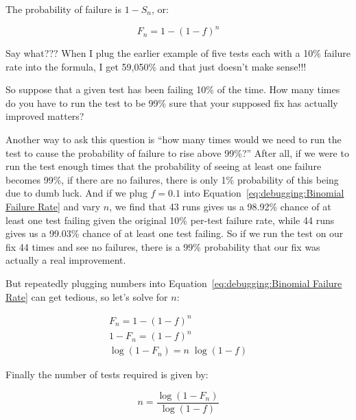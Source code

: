 The probability of failure is $1-S_n$, or:

\begin{equation}
	F_n = 1-\left(1-f\right)^n
\label{eq:debugging:Binomial Failure Rate}
\end{equation}

\QuickQuiz{}
	Say what???
	When I plug the earlier example of five tests each with a
	10\% failure rate into the formula, I get 59,050\% and that
	just doesn't make sense!!!
 \QuickQuizEnd

So suppose that a given test has been failing 10\% of the time.
How many times do you have to run the test to be 99\% sure that
your supposed fix has actually improved matters?

Another way to ask this question is ``how many times would we need
to run the test to cause the probability of failure to rise above 99\%?''
After all, if we were to run the test enough times that the probability
of seeing at least one failure becomes 99\%, if there are no failures,
there is only 1\% probability of this being due to dumb luck.
And if we plug $f=0.1$ into
Equation~\ref{eq:debugging:Binomial Failure Rate} and vary $n$,
we find that 43 runs gives us a 98.92\% chance of at least one test failing
given the original 10\% per-test failure rate,
while 44 runs gives us a 99.03\% chance of at least one test failing.
So if we run the test on our fix 44 times and see no failures, there
is a 99\% probability that our fix was actually a real improvement.

But repeatedly plugging numbers into
Equation~\ref{eq:debugging:Binomial Failure Rate}
can get tedious, so let's solve for $n$:

\begin{eqnarray}
	F_n = 1-\left(1-f\right)^n \\
	1 - F_n = \left(1-f\right)^n \\
	\log \left(1 - F_n\right) = n \; \log \left(1 - f\right)
\end{eqnarray}

Finally the number of tests required is given by:

\begin{equation}
	n = \frac{\log\left(1 - F_n\right)}{\log\left(1 - f\right)}
\label{eq:debugging:Binomial Number of Tests Required}
\end{equation}

